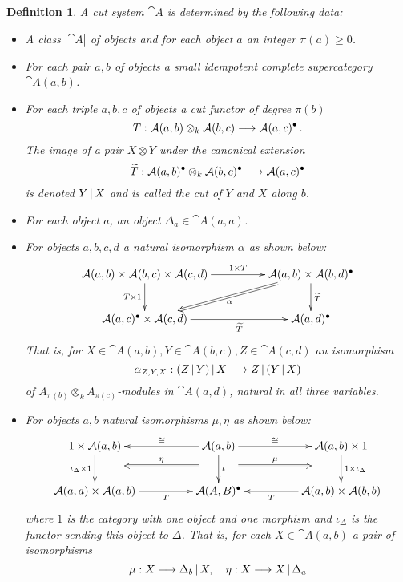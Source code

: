 \documentclass[english,letter paper,12pt,leqno]{article}
\theoremstyle{example}
\newtheorem{definition}[theorem]{Definition}
\numberwithin{equation}{section}
\begin{document}
\begin{definition} A \emph{cut system} $\cat{A}$ is determined by the following data:
\begin{itemize}
\item A class $|\cat{A}|$ of objects and for each object $a$ an integer $\pi(a) \ge 0$.
\item For each pair $a,b$ of objects a small idempotent complete supercategory $\cat{A}(a,b)$. 
\item For each triple $a,b,c$ of objects a cut functor of degree $\pi(b)$
\[
T: \mathcal{A}(a,b) \otimes_k \mathcal{A}(b,c) \longrightarrow \mathcal{A}(a,c)^{\bullet}\,.
\]
The image of a pair $X \otimes Y$ under the canonical extension
\[
\widetilde{T}: \mathcal{A}(a,b)^\bullet \otimes_k \mathcal{A}(b,c)^\bullet \longrightarrow \mathcal{A}(a,c)^\bullet
\]
is denoted $Y \,|\, X$ and is called the \emph{cut of $Y$ and $X$ along $b$}.
\item For each object $a$, an object $\Delta_a \in \cat{A}(a,a)$.
\item For objects $a,b,c,d$ a natural isomorphism $\alpha$ as shown below:
\[
\xymatrix@C+2pc{
\cat{A}(a,b) \times \cat{A}(b,c) \times \cat{A}(c,d) \ar[d]_-{T \times 1} \ar[r]^-{1 \times T} & \cat{A}(a,b) \times \cat{A}(b,d)^\bullet \ar[d]^{\widetilde{T}} \ar@{=>}[dl]^-{\alpha}\\
\cat{A}(a,c)^\bullet \times \cat{A}(c,d) \ar[r]_-{\widetilde{T}} & \cat{A}(a,d)^\bullet
}
\]
That is, for $X \in \cat{A}(a,b), Y \in \cat{A}(b,c), Z \in \cat{A}(c,d)$ an isomorphism
\[
\alpha_{Z,Y,X}: ( Z \,|\, Y ) \,|\, X \longrightarrow Z \,|\, ( Y \,|\, X )
\]
of $A_{\pi(b)} \otimes_k A_{\pi(c)}$-modules in $\cat{A}(a,d)$, natural in all three variables.
\item For objects $a,b$ natural isomorphisms $\mu, \eta$ as shown below:
\[
\xymatrix@C+2pc{
1 \times \cat{A}(a,b) \ar[d]_-{\iota_{\Delta} \times 1} & \cat{A}(a,b) \ar@{=>}@<4ex>[l]_-{\eta} \ar@{=>}@<-4ex>[r]^-{\mu} \ar[d]^-{\iota} \ar[l]_-{\cong} \ar[r]^-{\cong} & \cat{A}(a,b) \times 1 \ar[d]^-{1 \times \iota_{\Delta}}\\
\cat{A}(a,a) \times \cat{A}(a,b) \ar[r]_-{T} & \cat{A}(A,B)^\bullet & \cat{A}(a,b) \times \cat{A}(b,b) \ar[l]^-{T}
}
\]
where $1$ is the category with one object and one morphism and $\iota_{\Delta}$ is the functor sending this object to $\Delta$. That is, for each $X \in \cat{A}(a,b)$ a pair of isomorphisms
\begin{equation}\label{eq:defn_cutsys_lambda}
\mu: X \longrightarrow \Delta_b \,|\, X, \quad \eta: X \longrightarrow X \,|\, \Delta_a
\end{equation}

\end{itemize}
\end{definition}
\end{document}
